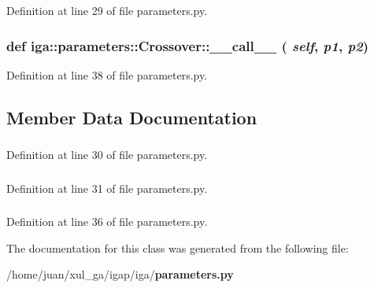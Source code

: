 Definition at line 29 of file parameters.py.
\subsubsection{\setlength{\rightskip}{0pt plus 5cm}def iga::parameters::Crossover::\_\-\_\-call\_\-\_\- ( {\em self},  {\em p1},  {\em p2})}\label{classiga_1_1parameters_1_1Crossover_fc4133e4814d30a73d33d941aebc19cf}




Definition at line 38 of file parameters.py.

\subsection{Member Data Documentation}
\subsubsection{}\label{classiga_1_1parameters_1_1Crossover_7b0328075fe0c22b533934408bd42a74}




Definition at line 30 of file parameters.py.
\subsubsection{}\label{classiga_1_1parameters_1_1Crossover_796dc4a8245cbb9d63d4a44568853adf}




Definition at line 31 of file parameters.py.
\subsubsection{\hspace{0.3cm}{\tt  [private]}}\label{classiga_1_1parameters_1_1Crossover_c6c1edfc3b6377ba7912417d8f818eae}




Definition at line 36 of file parameters.py.

The documentation for this class was generated from the following file:\begin{CompactItemize}
\item 
/home/juan/xul\_\-ga/igap/iga/{\bf parameters.py}\end{CompactItemize}
